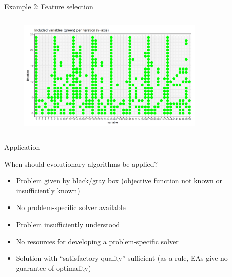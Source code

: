 \documentclass[11pt,compress,t,notes=noshow, xcolor=table]{beamer}
\begin{document}
\begin{vbframe}{Example 2: Feature selection}
\vspace{0.5cm}
\begin{center}
\begin{figure}
  \includegraphics[height = 6cm, width = 9cm]{figure_man/var-selection2.png}
\end{figure}
\end{center}

\end{vbframe}


\begin{vbframe}{Application}

When should evolutionary algorithms be applied?

\begin{itemize}
\item Problem given by black/gray box (objective function not known or insufficiently known)
\item No problem-specific solver available
\item Problem insufficiently understood
\item No resources for developing a problem-specific solver
\item Solution with \enquote{satisfactory quality} sufficient (as a rule, EAs give no guarantee of optimality)
\end{itemize}

\end{vbframe}




%
%
%
\end{document}
